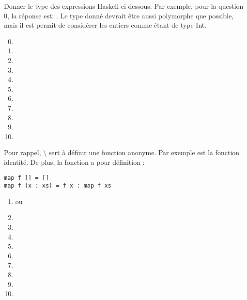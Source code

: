 \begin{Exercise}
\label{ex:type_inference3}
Donner le type des expressions Haskell ci-dessous. Par exemple, pour
la question 0, la réponse est: . Le type donné
devrait être aussi polymorphe que possible, mais il est permit de
considérer les entiers comme étant de type Int.

\begin{enumerate}
\setcounter{enumi}{-1}
\item {}
\item \codeinline{[['a', 'b'], []]}
\item \codeinline{(['a', 'b'], [])}
\item {}
\item {}
\item {}
\item {}
\item {}
\item {}
\item {}
\item {}
\end{enumerate}

Pour rappel, {\textbackslash } sert à définir une fonction anonyme. Par
  exemple  est la fonction identité. De plus, la
  fonction  a pour définition :
\begin{verbatim}
map f [] = []               
map f (x : xs) = f x : map f xs
\end{verbatim}

\end{Exercise}

\begin{Answer}[ref={ex:type_inference3}]
\begin{enumerate}
\item \codeinline{[[Char]]} ou \codeinline{[String]}
\item \codeinline{([Char], [a])}
\item {}
\item {}
\item {}
\item \codeinline{[Int]}
\item {}
\item \codeinline{[Int] -> [Int]}
\item \codeinline{[Char]}
\item {}
\end{enumerate}
  
\end{Answer}
